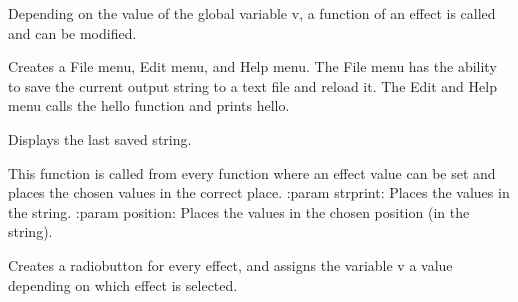 \documentclass[letterpaper,10pt,english]{sphinxmanual}
\begin{document}
\begin{fulllineitems}
\label{Code:GUI.main}
Depending on the value of the global variable v, a function of an effect is called and can be modified.

\end{fulllineitems}


\begin{fulllineitems}
\label{Code:GUI.makeMenu}
Creates a File menu, Edit menu, and Help menu.
The File menu has the ability to save the current output string to a text file and reload it. The Edit and Help menu calls the hello
function and prints hello.

\end{fulllineitems}


\begin{fulllineitems}
\label{Code:GUI.openFile}
Displays the last saved string.

\end{fulllineitems}


\begin{fulllineitems}
\label{Code:GUI.outp}
This function is called from every function where an effect value can be set and places the chosen values in the correct place.
:param strprint: Places the values in the string.
:param position: Places the values in the chosen position (in the string).

\end{fulllineitems}


\begin{fulllineitems}
\label{Code:GUI.radiobuttons}
Creates a radiobutton for every effect, and assigns the variable v a value depending on which effect is selected.

\end{fulllineitems}

\end{document}
